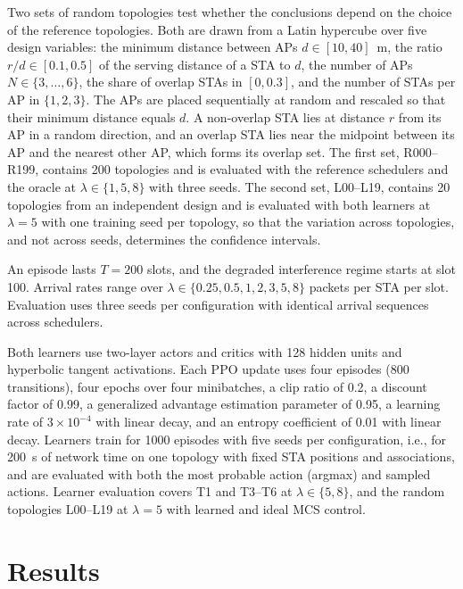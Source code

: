 \documentclass{ieeeaccess}
\begin{document}
Two sets of random topologies test whether the conclusions depend on the choice of the reference topologies. Both are drawn from a Latin hypercube over five design variables: the minimum distance between APs $d \in [10, 40]$~m, the ratio $r/d \in [0.1, 0.5]$ of the serving distance of a STA to $d$, the number of APs $N \in \{3, \dots, 6\}$, the share of overlap STAs in $[0, 0.3]$, and the number of STAs per AP in $\{1, 2, 3\}$. The APs are placed sequentially at random and rescaled so that their minimum distance equals $d$. A non-overlap STA lies at distance $r$ from its AP in a random direction, and an overlap STA lies near the midpoint between its AP and the nearest other AP, which forms its overlap set. The first set, R000--R199, contains 200 topologies and is evaluated with the reference schedulers and the oracle at $\lambda \in \{1, 5, 8\}$ with three seeds. The second set, L00--L19, contains 20 topologies from an independent design and is evaluated with both learners at $\lambda = 5$ with one training seed per topology, so that the variation across topologies, and not across seeds, determines the confidence intervals.

An episode lasts $T = 200$ slots, and the degraded interference regime starts at slot 100. Arrival rates range over $\lambda \in \{0.25, 0.5, 1, 2, 3, 5, 8\}$ packets per STA per slot. Evaluation uses three seeds per configuration with identical arrival sequences across schedulers.

Both learners use two-layer actors and critics with 128 hidden units and hyperbolic tangent activations. Each PPO update uses four episodes (800 transitions), four epochs over four minibatches, a clip ratio of 0.2, a discount factor of 0.99, a generalized advantage estimation parameter of 0.95, a learning rate of $3 \times 10^{-4}$ with linear decay, and an entropy coefficient of 0.01 with linear decay. Learners train for 1000 episodes with five seeds per configuration, i.e., for 200~s of network time on one topology with fixed STA positions and associations, and are evaluated with both the most probable action (argmax) and sampled actions. Learner evaluation covers T1 and T3--T6 at $\lambda \in \{5, 8\}$, and the random topologies L00--L19 at $\lambda = 5$ with learned and ideal MCS control.

\section{Results}
\label{sec:results}
\end{document}
